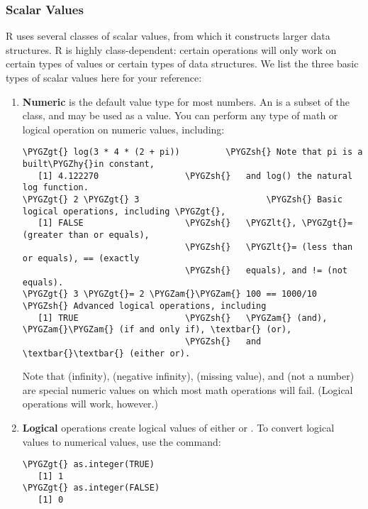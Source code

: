 \documentclass[letterpaper,10pt,english]{sphinxmanual}
\def\PYGZam{\char`\&}
\def\PYGZlt{\char`\<}
\def\PYGZgt{\char`\>}
\def\PYGZsh{\char`\#}
\def\PYGZhy{\char`\-}
\begin{document}
\subsubsection{Scalar Values}
\label{docs/user_guide:scalar-values}
R uses several classes of scalar values, from which it constructs larger
data structures. R is highly class-dependent: certain operations will
only work on certain types of values or certain types of data
structures. We list the three basic types of scalar values here for your
reference:
\begin{enumerate}
\item {} 
\textbf{Numeric} is the default value type for most numbers. An
 is a subset of the  class, and may be used as
a  value. You can perform any type of math or logical
operation on numeric values, including:

\begin{Verbatim}[commandchars=\\\{\}]
\PYGZgt{} log(3 * 4 * (2 + pi))         \PYGZsh{} Note that pi is a built\PYGZhy{}in constant,
   [1] 4.122270                 \PYGZsh{}   and log() the natural log function.
\PYGZgt{} 2 \PYGZgt{} 3                         \PYGZsh{} Basic logical operations, including \PYGZgt{},
   [1] FALSE                    \PYGZsh{}   \PYGZlt{}, \PYGZgt{}= (greater than or equals),
                                \PYGZsh{}   \PYGZlt{}= (less than or equals), == (exactly
                                \PYGZsh{}   equals), and != (not equals).
\PYGZgt{} 3 \PYGZgt{}= 2 \PYGZam{}\PYGZam{} 100 == 1000/10      \PYGZsh{} Advanced logical operations, including
   [1] TRUE                     \PYGZsh{}   \PYGZam{} (and), \PYGZam{}\PYGZam{} (if and only if), \textbar{} (or),
                                \PYGZsh{}   and \textbar{}\textbar{} (either or).
\end{Verbatim}

Note that  (infinity),  (negative infinity), 
(missing value), and  (not a number) are special numeric
values on which most math operations will fail. (Logical operations
will work, however.)

\item {} 
\textbf{Logical} operations create logical values of either  or
. To convert logical values to numerical values, use the
 command:

\begin{Verbatim}[commandchars=\\\{\}]
\PYGZgt{} as.integer(TRUE)
   [1] 1
\PYGZgt{} as.integer(FALSE)
   [1] 0
\end{Verbatim}


\end{enumerate}
\end{document}
